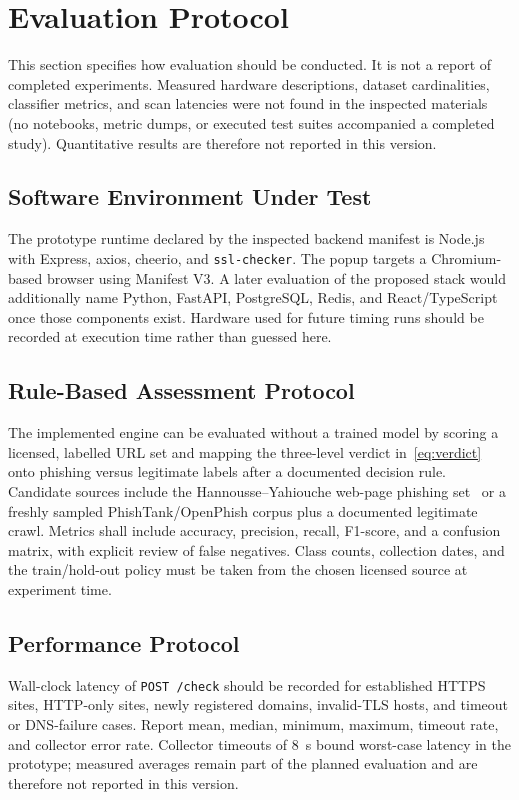 \documentclass[conference]{IEEEtran}
\begin{document}
\section{Evaluation Protocol}
\label{sec:eval}
This section specifies how evaluation should be conducted. It is not a report of completed experiments. Measured hardware descriptions, dataset cardinalities, classifier metrics, and scan latencies were not found in the inspected materials (no notebooks, metric dumps, or executed test suites accompanied a completed study). Quantitative results are therefore not reported in this version.

\subsection{Software Environment Under Test}
The prototype runtime declared by the inspected backend manifest is Node.js with Express, axios, cheerio, and \texttt{ssl-checker}. The popup targets a Chromium-based browser using Manifest V3. A later evaluation of the proposed stack would additionally name Python, FastAPI, PostgreSQL, Redis, and React/TypeScript once those components exist. Hardware used for future timing runs should be recorded at execution time rather than guessed here.

\subsection{Rule-Based Assessment Protocol}
The implemented engine can be evaluated without a trained model by scoring a licensed, labelled URL set and mapping the three-level verdict in~\eqref{eq:verdict} onto phishing versus legitimate labels after a documented decision rule. Candidate sources include the Hannousse--Yahiouche web-page phishing set~\cite{hannousse2021benchmark} or a freshly sampled PhishTank/OpenPhish corpus plus a documented legitimate crawl. Metrics shall include accuracy, precision, recall, F1-score, and a confusion matrix, with explicit review of false negatives. Class counts, collection dates, and the train/hold-out policy must be taken from the chosen licensed source at experiment time.

\subsection{Performance Protocol}
Wall-clock latency of \texttt{POST /check} should be recorded for established HTTPS sites, HTTP-only sites, newly registered domains, invalid-TLS hosts, and timeout or DNS-failure cases. Report mean, median, minimum, maximum, timeout rate, and collector error rate. Collector timeouts of 8~s bound worst-case latency in the prototype; measured averages remain part of the planned evaluation and are therefore not reported in this version.
\end{document}
